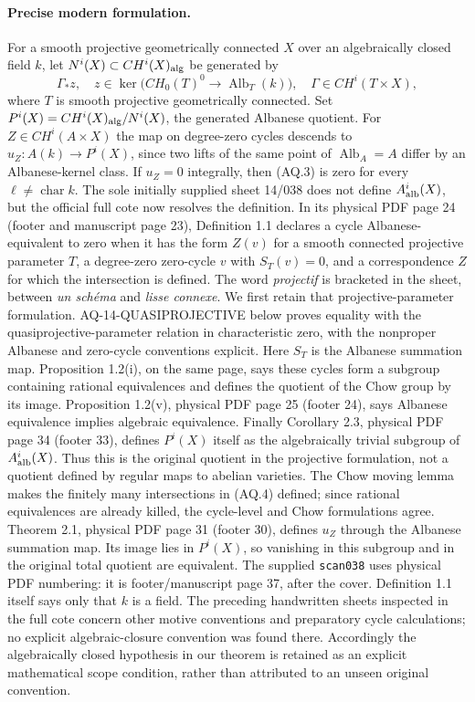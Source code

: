 \paragraph{Precise modern formulation.}
For a smooth projective geometrically connected $X$ over an
algebraically closed field $k$, let $N^i(X)\subset CH^i(X)_{\rm alg}$
be generated by
\[
 \Gamma_*z,\quad
 z\in\ker\bigl(CH_0(T)^0\longrightarrow\operatorname{Alb}_T(k)\bigr),
 \quad\Gamma\in CH^i(T\times X),                                \tag{AQ.4}
\]
where $T$ is smooth projective geometrically connected.
Set $P^i(X)=CH^i(X)_{\rm alg}/N^i(X)$, the generated Albanese
quotient. For $Z\in CH^i(A\times X)$
the map on degree-zero cycles descends to
$u_Z:A(k)\to P^i(X)$, since two lifts of the same point of
$\operatorname{Alb}_A=A$ differ by an Albanese-kernel class.
If $u_Z=0$ integrally, then (AQ.3) is zero for every
$\ell\ne\operatorname{char}k$.
The sole initially supplied sheet 14/038 does not define
$A^i_{\rm alb}(X)$, but the official full cote now resolves
the definition. In its physical PDF page 24 (footer and
manuscript page 23), Definition 1.1 declares a cycle
Albanese-equivalent to zero when it has the form
$Z(v)$ for a smooth connected projective parameter $T$,
a degree-zero zero-cycle $v$ with $S_T(v)=0$, and a
correspondence $Z$ for which the intersection is defined.
The word \emph{projectif} is bracketed in the sheet,
between \emph{un sch\'ema} and \emph{lisse connexe}.
We first retain that projective-parameter formulation.
AQ-14-QUASIPROJECTIVE below proves equality with the
quasiprojective-parameter relation in characteristic zero,
with the nonproper Albanese and zero-cycle conventions explicit.
Here $S_T$ is the Albanese summation map.
Proposition 1.2(i), on the same page, says these cycles
form a subgroup containing rational equivalences and
defines the quotient of the Chow group by its image.
Proposition 1.2(v), physical PDF page 25 (footer 24),
says Albanese equivalence implies algebraic equivalence.
Finally Corollary 2.3, physical PDF page 34 (footer 33),
defines $P^i(X)$ itself as the algebraically trivial
subgroup of $A^i_{\rm alb}(X)$. Thus this is the
original quotient in the projective formulation,
not a quotient defined by regular maps to abelian
varieties. The Chow moving lemma makes the finitely
many intersections in (AQ.4) defined; since rational
equivalences are already killed, the cycle-level and
Chow formulations agree. Theorem 2.1, physical PDF
page 31 (footer 30), defines $u_Z$ through the
Albanese summation map. Its image lies in $P^i(X)$,
so vanishing in this subgroup and in the original
total quotient are equivalent. The supplied
\texttt{scan038} uses physical PDF numbering:
it is footer/manuscript page 37, after the cover.
Definition 1.1 itself says only that $k$ is a field.
The preceding handwritten sheets inspected in the full
cote concern other motive conventions and preparatory
cycle calculations; no explicit algebraic-closure
convention was found there. Accordingly the
algebraically closed hypothesis in our theorem is
retained as an explicit mathematical scope condition,
rather than attributed to an unseen original convention.

